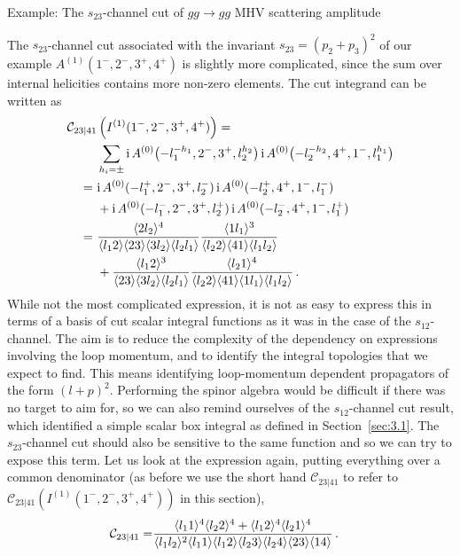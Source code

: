 \begin{example}{Example: The $s_{23}$-channel cut of $gg\to gg$ MHV scattering amplitude}

The $s_{23}$-channel cut associated with the invariant $s_{23} = (p_2+p_3)^2$ of our example
$A^{(1)}(1^-,2^-,3^+,4^+)$ is slightly more complicated, since the sum over internal
helicities contains more non-zero elements. The cut integrand can be written as
\begin{align}
  \mathcal{C}_{23|41}&\left(I^{(1)}(1^-,2^-,3^+,4^+)\right) = \nonumber\\&
  \sum_{h_i=\pm} \i \, A^{(0)}\bigl(-l_1^{-h_1},2^-,3^+,l_2^{h_2}\bigr) \, \i \, A^{(0)}\bigl(-l_2^{-h_2},4^+,1^-,l_1^{h_1}\bigr) \nonumber\\
  = \ & \i \, A^{(0)}(-l_1^+,2^-,3^+,l_2^-) \, \i \, A^{(0)}(-l_2^+,4^+,1^-,l_1^-) \nonumber\\
  &+ \i \, A^{(0)}(-l_1^-,2^-,3^+,l_2^+) \, \i \, A^{(0)}(-l_2^-,4^+,1^-,l_1^+) \nonumber\\
  = \ &  \frac{\spA2{l_2}^4}{\spA{l_1}2\spA23\spA3{l_2}\spA{l_2}{l_1}} \frac{\spA1{l_1}^3}{\spA{l_2}2\spA41\spA{l_1}{l_2}} \nonumber\\
  &+ \frac{\spA{l_1}2^3}{\spA23\spA3{l_2}\spA{l_2}{l_1}} \frac{\spA{l_2}1^4}{\spA{l_2}2\spA41\spA1{l_1}\spA{l_1}{l_2}} \,.
  \label{eq:4gtchannelintegrand}
\end{align}
While not the most complicated expression, it is not as easy to express this in
terms of a basis of cut scalar integral functions as it was in the case of the
$s_{12}$-channel.
The aim is to reduce the complexity of the dependency on expressions
involving the loop momentum, and to identify the integral topologies that we
expect to find. This means identifying loop-momentum dependent propagators of
the form $(l+p)^2$. Performing the spinor algebra would be difficult if there
was no target to aim for, so we can also remind ourselves of the $s_{12}$-channel cut
result, which identified a simple scalar box integral as defined in Section~\ref{sec:3.1}. 
The $s_{23}$-channel cut should also be sensitive to the same function and so we can try to expose this term.
Let us look at the expression again, putting everything over a common
denominator (as before we use the short hand $\mathcal{C}_{23|41}$ to refer to $\mathcal{C}_{23|41}\left(I^{(1)}(1^-,2^-,3^+,4^+)\right)$ in this section),
\begin{align}
  \mathcal{C}_{23|41} =& \frac{\spA{l_1}1^4\spA{l_2}2^4 + \spA{l_1}2^4\spA{l_2}{1}^4}{\spA{l_1}{l_2}^2\spA{l_1}1\spA{l_1}{2}\spA{l_2}3\spA{l_2}4\spA23\spA14} \,.

\end{align}
\end{example}
